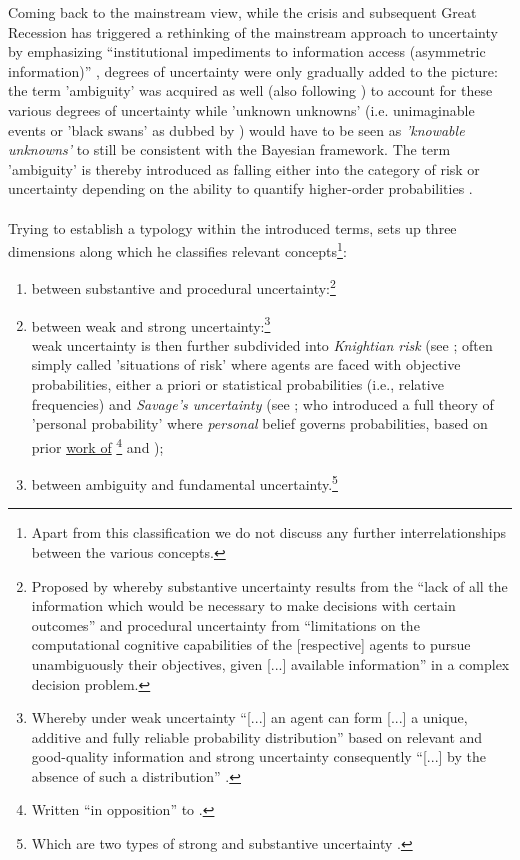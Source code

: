 \documentclass[a4paper,11pt,listof=nochaptergap,oneside,pointednumbers,bibtotoc,bigheadings,liststotoc,hidelinks]{scrbook}
\theoremstyle{mysatz}
\theoremstyle{mydefinition}
\theoremstyle{mytheorem}
\theoremstyle{mybemerkung}
\begin{document}
Coming back to the mainstream view, while the crisis and subsequent Great Recession has triggered a rethinking of the mainstream approach to uncertainty by emphasizing ``institutional impediments to information access (asymmetric information)'' \citep[p. 8]{dow:16}, degrees of uncertainty were only gradually added to the picture: the term 'ambiguity' was acquired as well (also following \citealp[p. 330]{camererandweber:92}) to account for these various degrees of uncertainty while 'unknown unknowns' (i.e. unimaginable events or 'black swans' as dubbed by \citealp{taleb:08}) would have to be seen as \textit{'knowable unknowns'} to still be consistent with the Bayesian framework. The term 'ambiguity' is thereby introduced as falling either into the category of risk or uncertainty depending on the ability to quantify higher-order probabilities \citep{dow:16}.\\
\\
Trying to establish a typology within the introduced terms, \citet{dequech:14}  sets up three dimensions along which he classifies relevant concepts\footnote{Apart from this classification we do not discuss any further interrelationships between the various concepts.}: 
\begin{enumerate}
	\item between substantive and procedural uncertainty:\footnote{Proposed by \citet[p. 145]{dosiandegidi:91} whereby substantive uncertainty results from the ``lack of all the information which would be necessary to make decisions with certain outcomes'' and procedural uncertainty from ``limitations on the computational cognitive capabilities of the [respective] agents to pursue unambiguously their objectives, given [...] available information'' in a complex decision problem. }
	\item between weak and strong uncertainty:\footnote{Whereby under weak uncertainty ``[...] an agent can form [...] a unique, additive and fully reliable probability distribution'' based on relevant and good-quality information and strong uncertainty consequently ``[...] by the absence of such a distribution'' \citep[p. 622/623]{dequech:14}.} \\
	weak uncertainty is then further subdivided into \textit{Knightian risk} (see \citet{knight:21}; often simply called 'situations of risk' where agents are faced with objective probabilities, either a priori or statistical probabilities (i.e., relative frequencies) and \textit{Savage's uncertainty} (see \citet{savage:54}; who introduced a full theory of 'personal probability' where \textit{personal} belief governs probabilities, based on prior \href{https://archive.org/stream/in.ernet.dli.2015.223806/2015.223806.The-Foundations#page/n289/mode/2up}{work of} \href{http://www.brunodefinetti.it/Link/Subjective%20Expected%20Utility%20-%20Intro.htm}{\citet{ramsey:26}\footnote{Written ``in opposition'' to \citet{keynes:21}.} and \citet{finetti:37}});
	\item between ambiguity and fundamental uncertainty.\footnote{Which are two types of strong and substantive uncertainty \citep{dequesh:00}.}
\end{enumerate}
\vspace{1cm}
\end{document}

